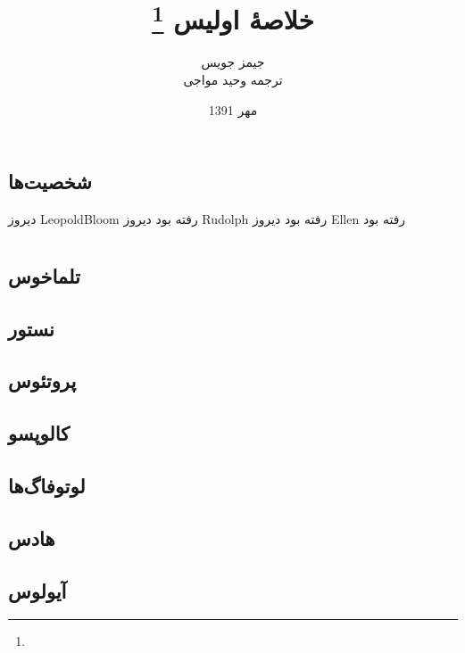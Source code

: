 \documentclass[12pt,onecolumn,a4paper]{book}
\begin{document}
    \title{خلاصۀ اولیس \footnote{}}
    \author{جیمز جویس\\
    ترجمه وحید مواجی
    }
    \date{مهر 1391}
    \frontmatter                            %
    \maketitle                              %
    \tableofcontents                        %
    \mainmatter


    \part{}
    \chapter{شخصیت‌ها}
    دیروز \gls{LeopoldBloom} رفته بود
    دیروز \gls{Rudolph} رفته بود
    دیروز \gls{Ellen} رفته بود

    \part{}
    \chapter{تلماخوس}
    \chapter{نستور}
    \chapter{پروتئوس}
    \chapter{کالوپسو}
    \chapter{لوتوفاگ‌ها}
    \chapter{هادس}
    \chapter{آیولوس}
\end{document}
